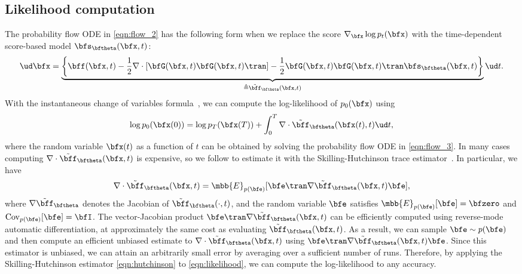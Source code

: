 \subsection{Likelihood computation}\label{app:prob_flow_likelihood}
The probability flow ODE in \cref{eqn:flow_2} has the following form when we replace the score $\nabla_\bfx \log p_t(\bfx)$ with the time-dependent score-based model $\bfs_\bftheta(\bfx, t)$:
\begin{align}
      \ud \bfx = \underbrace{\bigg\{\bff(\bfx, t) - \frac{1}{2} \nabla \cdot [\bfG(\bfx, t)\bfG(\bfx, t)\tran] - \frac{1}{2} \bfG(\bfx, t)\bfG(\bfx, t)\tran \bfs_\bftheta(\bfx, t)\bigg\}}_{\triangleq \tilde{\bff}_\bftheta(\bfx, t)} \ud t. \label{eqn:flow_3}
\end{align}
With the instantaneous change of variables formula~\citep{chen2018neural}, we can compute the log-likelihood of $p_0(\bfx)$ using
\begin{align}
    \log p_0(\bfx(0)) = \log p_T(\bfx(T)) + \int_0^T \nabla \cdot \tilde{\bff}_\bftheta(\bfx(t), t) \ud t, \label{eqn:likelihood}
\end{align}
where the random variable $\bfx(t)$ as a function of $t$ can be obtained by solving the probability flow ODE in \cref{eqn:flow_3}. In many cases computing $\nabla \cdot \tilde{\bff}_\bftheta(\bfx, t)$ is expensive, so we follow \citet{grathwohl2018ffjord} to estimate it with the Skilling-Hutchinson trace estimator~\citep{skilling1989eigenvalues,hutchinson1990stochastic}. In particular, we have
\begin{align}
    \nabla \cdot \tilde{\bff}_\bftheta(\bfx, t) = \mbb{E}_{p(\bfe)}[\bfe\tran \nabla \tilde{\bff}_\bftheta(\bfx, t)\bfe], \label{eqn:hutchinson}
\end{align}
where $\nabla \tilde{\bff}_\bftheta$ denotes the Jacobian of $\tilde{\bff}_\bftheta(\cdot, t)$, and the random variable $\bfe$ satisfies $\mbb{E}_{p(\bfe)}[\bfe] = \bfzero$ and $\operatorname{Cov}_{p(\bfe)}[\bfe] = \bfI$. The vector-Jacobian product $\bfe\tran \nabla\tilde{\bff}_\bftheta(\bfx, t)$ can be efficiently computed using reverse-mode automatic differentiation, at approximately the same cost as evaluating $\tilde{\bff}_\bftheta(\bfx, t)$. As a result, we can sample $\bfe \sim p(\bfe)$ and then compute an efficient unbiased estimate to $\nabla \cdot \tilde{\bff}_\bftheta(\bfx, t)$ using $\bfe\tran \nabla \tilde{\bff}_\bftheta(\bfx, t) \bfe$. Since this estimator is unbiased, we can attain an arbitrarily small error by averaging over a sufficient number of runs. Therefore, by applying the Skilling-Hutchinson estimator \cref{eqn:hutchinson} to \cref{eqn:likelihood}, we can compute the log-likelihood to any accuracy.


